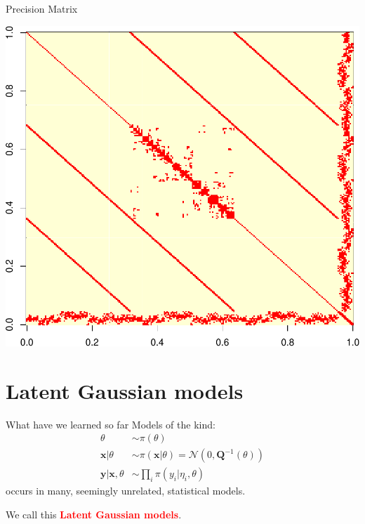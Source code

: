 \documentclass[
  ignorenonframetext,
]{beamer}
\begin{document}
\begin{frame}{Precision Matrix}
\protect\hypertarget{precision-matrix-1}{}
\begin{center}\includegraphics[width=0.8\linewidth]{graphics/Q3} \end{center}
\end{frame}

\hypertarget{latent-gaussian-models}{%
\section{Latent Gaussian models}\label{latent-gaussian-models}}

\begin{frame}{What have we learned so far}
\protect\hypertarget{what-have-we-learned-so-far}{}
Models of the kind: \[
\begin{aligned}
\theta & \sim \pi(\theta)\\
\mathbf{x}|\theta& \sim \pi(\mathbf{x}|\theta) = \mathcal{N}(0, \mathbf{Q}^{-1}(\theta))\\
\mathbf{y}|\mathbf{x},\theta & \sim \prod_i\pi(y_i|\eta_i,\theta)
\end{aligned}
\] occurs in many, seemingly unrelated, statistical models.

We call this \textcolor{red}{\bf Latent Gaussian models}.
\end{frame}
\end{document}
